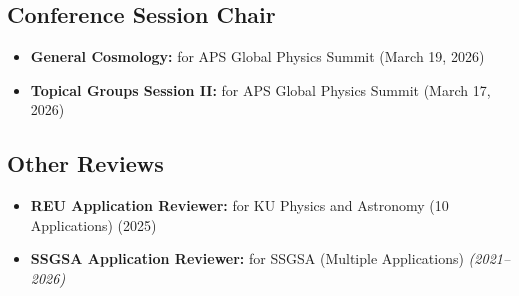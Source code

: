 \documentclass[10pt]{report}
\begin{document}
\subsection*{Conference Session Chair}
\begin{itemize}

    \item {\bf General Cosmology:} for APS Global Physics Summit (March 19, 2026)

    \vspace{0.0em}
    \noindent  
    \item {\bf Topical Groups Session II:} for APS Global Physics Summit (March 17, 2026)

\end{itemize}

\subsection*{Other Reviews}
\begin{itemize}

    \item {\bf REU Application Reviewer:} for KU Physics and Astronomy (10 Applications) (2025)

    \vspace{0.0em}
    \noindent  
    \item {\bf SSGSA Application Reviewer:} for SSGSA (Multiple Applications) \textit{(2021--2026)}

\end{itemize}


\end{document}
